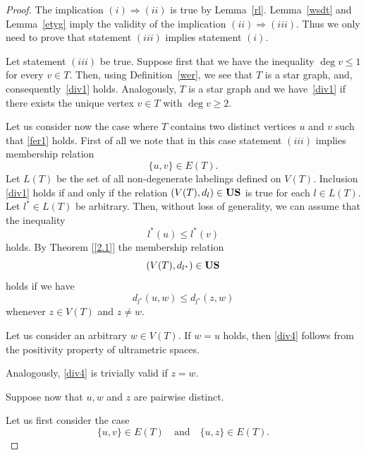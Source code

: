 \documentclass[11pt]{article}
\theoremstyle{definition}
\theoremstyle{remark}
\numberwithin{equation}{section}
\begin{document}
\begin{proof}
The implication $(i) \Rightarrow (ii)$ is true by Lemma~\ref{rl}.  
Lemma~\ref{wsdt} and Lemma~\ref{etyg} imply the validity of the implication $(ii) \Rightarrow (iii)$.  
Thus we only need to prove that statement $(iii)$ implies statement $(i)$.  


Let statement $(iii)$ be true. Suppose first that we have the inequality $\deg v \leq 1$ for every $v \in T$.  
Then, using Definition~\ref{wer}, we see that $T$ is a star graph, and, consequently~\eqref{div1} holds.  
Analogously, 
$T$ is a star graph and we have~\eqref{div1}
if there exists the unique vertex $v \in T$ with $\deg v \geq 2$.






Let us consider now the case
where \( T \) contains two distinct
vertices \( u \) and \( v \)
such that \eqref{fer1} holds. First of all we note that in this case statement $(iii)$ implies membership relation 
\begin{equation}
    \label{ji1}
    \{u,v\}\in E(T).
\end{equation}
Let \( L(T) \) be the set of all non-degenerate labelings
defined on \( V(T) \).
Inclusion \eqref{div1} holds if and only if the relation 
$(V(T),d_l)\in {\bf US}$ is true for each  $l \in L(T).$
Let \( l^*\in L(T) \) be arbitrary.
Then, without loss of generality, we
can assume that the inequality
\begin{equation}
    \label{div3}
l^*(u) \leq l^*(v) 
\end{equation}
holds.
By Theorem \ref{[2.1]} the membership relation
\[
(V(T), d_{l^*}) \in {\bf US}
\]
holds if we have
\begin{equation}
    \label{div4}
d_{l^*}(u, w) \leq d_{l^*}(z, w) 
\end{equation}
whenever \( z \in V(T) \) and \( z \neq w \).



Let us consider an arbitrary \( w \in V(T) \).
If \(  w=u \) holds, then \eqref{div4} follows
from the positivity property of ultrametric spaces.

Analogously, \eqref{div4} is trivially
valid if \( z = w \).

Suppose now that \( u, w \) and $z$
are pairwise distinct. 

Let us first consider the case
\begin{equation}
    \label{div6}
\{u,v\} \in E(T) \quad \text{and} \quad \{u,z\} \in E(T).
\end{equation}





\end{proof}
\end{document}
